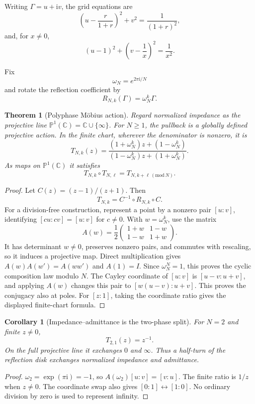 \documentclass[11pt,letterpaper]{article}
\newtheorem{theorem}{Theorem}[section]
\theoremstyle{plain}
\theoremstyle{plain}
\theoremstyle{plain}
\newtheorem{corollary}[corollary]{Corollary}
\theoremstyle{definition}
\theoremstyle{definition}
\theoremstyle{definition}
\theoremstyle{definition}
\theoremstyle{remark}
\theoremstyle{remark}
\theoremstyle{remark}
\theoremstyle{remark}
\newcommand{\bbC}{\mathbb C}
\newcommand{\Gam}{\Gamma}
\newcommand{\ii}{\mathrm i}
\begin{document}
Writing $\Gam=u+\ii v$, the grid equations are
\[
\left(u-\frac{r}{1+r}\right)^2+v^2=\frac1{(1+r)^2},
\]
and, for $x\ne0$,
\[
(u-1)^2+\left(v-\frac1x\right)^2=\frac1{x^2}.
\]

Fix
\[
\omega_N=e^{2\pi\ii/N}
\]
and rotate the reflection coefficient by
\[
R_{N,k}(\Gam)=\omega_N^k\Gam.
\]

\begin{theorem}[Polyphase M\"obius action]\label{result:18}
Regard normalized impedance as the projective line $\mathbb P^1(\bbC)=\bbC\cup\{\infty\}$. For $N\ge1$, the pullback is a globally defined projective action. In the finite chart, wherever the denominator is nonzero, it is
\[
\boxed{
T_{N,k}(z)
=
\frac{(1+\omega_N^k)z+(1-\omega_N^k)}
{(1-\omega_N^k)z+(1+\omega_N^k)}.
}
\]
As maps on $\mathbb P^1(\bbC)$ it satisfies
\[
T_{N,k}\circ T_{N,\ell}=T_{N,k+\ell\, (\mathrm{mod}\,N)}.
\]
\end{theorem}

\begin{proof}
Let $C(z)=(z-1)/(z+1)$. Then
\[
T_{N,k}=C^{-1}\circ R_{N,k}\circ C.
\]
For a division-free construction, represent a point by a nonzero pair $[u:v]$, identifying $[cu:cv]=[u:v]$ for $c\ne0$. With $w=\omega_N^k$, use the matrix
\[
A(w)=\frac12\begin{pmatrix}1+w&1-w\\1-w&1+w\end{pmatrix}.
\]
It has determinant $w\ne0$, preserves nonzero pairs, and commutes with rescaling, so it induces a projective map. Direct multiplication gives $A(w)A(w')=A(ww')$ and $A(1)=I$. Since $\omega_N^N=1$, this proves the cyclic composition law modulo $N$. The Cayley coordinate of $[u:v]$ is $[u-v:u+v]$, and applying $A(w)$ changes this pair to $[w(u-v):u+v]$. This proves the conjugacy also at poles. For $[z:1]$, taking the coordinate ratio gives the displayed finite-chart formula.
\end{proof}

\begin{corollary}[Impedance--admittance is the two-phase split]\label{result:19}
For $N=2$ and finite $z\ne0$,
\[
\boxed{T_{2,1}(z)=z^{-1}.}
\]
On the full projective line it exchanges $0$ and $\infty$. Thus a half-turn of the reflection disk exchanges normalized impedance and admittance.
\end{corollary}
\begin{proof}
$\omega_2=\exp(\pi\ii)=-1$, so $A(\omega_2)[u:v]=[v:u]$. The finite ratio is $1/z$ when $z\ne0$. The coordinate swap also gives $[0:1]\leftrightarrow[1:0]$. No ordinary division by zero is used to represent infinity.
\end{proof}
\end{document}
